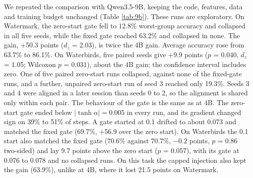 We repeated the comparison with Qwen3.5-9B, keeping the code, features, data and training budget unchanged
(Table \ref{tab:9b}). These runs are exploratory. On Watermark, the zero-start gate fell to 12.8\% worst-group
accuracy and collapsed in all five seeds, while the fixed gate reached 63.2\% and collapsed in none. The gain, +50.3
points (\(d_z\) = 2.03), is twice the 4B gain. Average accuracy rose from 63.7\% to 86.1\%. On Waterbirds, five
paired seeds give +9.9 points (\(p\) = 0.040, \(d_z\) = 1.05; Wilcoxon \(p\) = 0.031), about the 4B gain; the confidence
interval includes zero. One of five paired zero-start runs collapsed, against none of the fixed-gate runs, and a
further, unpaired zero-start run of seed 3 reached only 19.3\%. Seeds 3 and 4 were aligned in a later session than
seeds 0 to 2, so the alignment is shared only within each pair. The behaviour of the gate is the same as at 4B. The zero-start gate ended below \(|\tanh\alpha| = 0.005\) in every run, and its gradient
changed sign on 39\% to 51\% of steps. A gate started at 0.1 drifted to about 0.073 and matched the fixed gate (69.7\%,
+56.9 over the zero start). On Waterbirds the 0.1 start also matched the fixed gate (70.6\% against 70.7\%, \(-0.2\)
points, \(p\) = 0.86 two-sided) and lay 9.7 points above the zero start (\(p\) = 0.057), with its gate at 0.076 to 0.078
and no collapsed runs. On this task the capped injection also kept the gain (63.9\%), unlike at 4B, where it
lost 21.5 points on Watermark.

